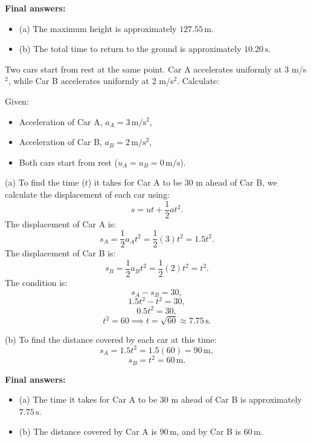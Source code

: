 \documentclass[addpoints]{exam}
\begin{document}
\begin{questions}
\begin{solution}[5cm]
\textbf{Final answers:}
\begin{itemize}
    \item (a) The maximum height is approximately \(127.55 \, \mathrm{m}\).
    \item (b) The total time to return to the ground is approximately \(10.20 \, \mathrm{s}\).
\end{itemize}

\end{solution}



\question Two cars start from rest at the same point. Car A accelerates uniformly at 3 m/s$^2$, while Car B accelerates uniformly at 2 m/s$^2$. Calculate:
\begin{solution}[6cm]
Given:
\begin{itemize}
    \item Acceleration of Car A, \(a_A = 3 \, \mathrm{m/s^2}\),
    \item Acceleration of Car B, \(a_B = 2 \, \mathrm{m/s^2}\),
    \item Both cars start from rest (\(u_A = u_B = 0 \, \mathrm{m/s}\)).
\end{itemize}

(a) To find the time (\(t\)) it takes for Car A to be 30 m ahead of Car B, we calculate the displacement of each car using:
\[s = ut + \frac{1}{2}at^2.\]
The displacement of Car A is:
\[s_A = \frac{1}{2}a_A t^2 = \frac{1}{2}(3)t^2 = 1.5t^2.\]
The displacement of Car B is:
\[s_B = \frac{1}{2}a_B t^2 = \frac{1}{2}(2)t^2 = t^2.\]
The condition is:
\[s_A - s_B = 30,\]
\[1.5t^2 - t^2 = 30,\]
\[0.5t^2 = 30,\]
\[t^2 = 60 \implies t = \sqrt{60} \approx 7.75 \, \mathrm{s}.\]

(b) To find the distance covered by each car at this time:
\[s_A = 1.5t^2 = 1.5(60) = 90 \, \mathrm{m},\]
\[s_B = t^2 = 60 \, \mathrm{m}.\]

\textbf{Final answers:}
\begin{itemize}
    \item (a) The time it takes for Car A to be 30 m ahead of Car B is approximately \(7.75 \, \mathrm{s}\).
    \item (b) The distance covered by Car A is \(90 \, \mathrm{m}\), and by Car B is \(60 \, \mathrm{m}\).
\end{itemize}
\end{solution}




\end{questions}
\end{document}

